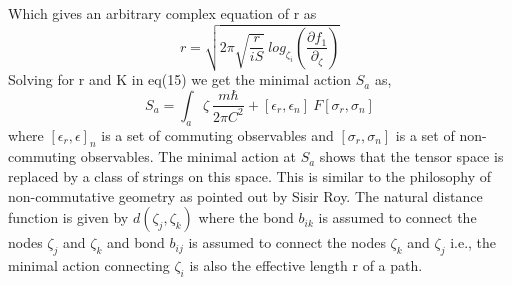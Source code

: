 \documentclass{article}
\begin{document}
Which gives an arbitrary complex equation of r as
\begin{equation}
    r = \sqrt{2 \pi \sqrt{\frac{r}{iS}}\ log_{\zeta_i}(\frac{\partial f_{1}}{\partial_{\zeta}})} 
\end{equation}
 Solving for r and K in eq(15) we get the minimal action $S_a$ as,
 \begin{equation}
  S_a= \int_{a} \zeta \ \frac{m \hbar}{2 \pi C^2} + [\epsilon_r,  \epsilon_n] \ F [\sigma_r ,\sigma_n] 
 \end{equation}
where $[\epsilon_r , \epsilon] _n$ is a set of commuting observables and $[\sigma_r, \sigma_n]$ is a set of non-commuting observables. The minimal action at $S_{a}$ shows that the tensor space is replaced by a class of strings on this space. This is similar to the philosophy of non-commutative geometry as pointed out by Sisir Roy. The natural distance function is given by $d (\zeta_{j},\zeta_{k})$ where the bond $b_{ik}$ is assumed to connect the nodes $\zeta_{j}$ and $\zeta_{k}$ and  bond $b_{ij}$ is assumed to connect the nodes $\zeta_{k}$ and $\zeta_{j}$ i.e., the minimal action connecting $\zeta_{i}$ is also the effective length r of a path.
\end{document}

